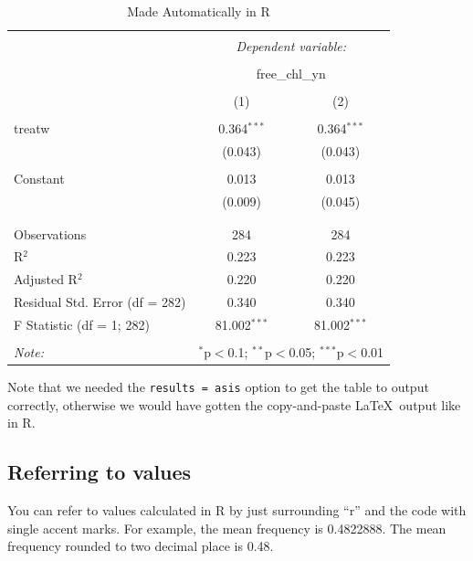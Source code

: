 \documentclass[11pt,]{article}
\begin{document}
\begin{table}[!htbp] \centering 
  \caption{Made Automatically in R} 
  \label{} 
\begin{tabular}{@{\extracolsep{5pt}}lcc} 
\\[-1.8ex]\hline 
\hline \\[-1.8ex] 
 & \multicolumn{2}{c}{\textit{Dependent variable:}} \\ 
\cline{2-3} 
\\[-1.8ex] & \multicolumn{2}{c}{free\_chl\_yn} \\ 
\\[-1.8ex] & (1) & (2)\\ 
\hline \\[-1.8ex] 
 treatw & 0.364$^{***}$ & 0.364$^{***}$ \\ 
  & (0.043) & (0.043) \\ 
  & & \\ 
 Constant & 0.013 & 0.013 \\ 
  & (0.009) & (0.045) \\ 
  & & \\ 
\hline \\[-1.8ex] 
Observations & 284 & 284 \\ 
R$^{2}$ & 0.223 & 0.223 \\ 
Adjusted R$^{2}$ & 0.220 & 0.220 \\ 
Residual Std. Error (df = 282) & 0.340 & 0.340 \\ 
F Statistic (df = 1; 282) & 81.002$^{***}$ & 81.002$^{***}$ \\ 
\hline 
\hline \\[-1.8ex] 
\textit{Note:}  & \multicolumn{2}{r}{$^{*}$p$<$0.1; $^{**}$p$<$0.05; $^{***}$p$<$0.01} \\ 
\end{tabular} 
\end{table}

Note that we needed the
\texttt{results\ =\ \textquotesingle{}asis\textquotesingle{}} option to
get the table to output correctly, otherwise we would have gotten the
copy-and-paste \LaTeX~output like in R.

\subsection{Referring to values}\label{referring-to-values}

You can refer to values calculated in R by just surrounding ``r'' and
the code with single accent marks. For example, the mean frequency is
0.4822888. The mean frequency rounded to two decimal place is 0.48.
\end{document}
